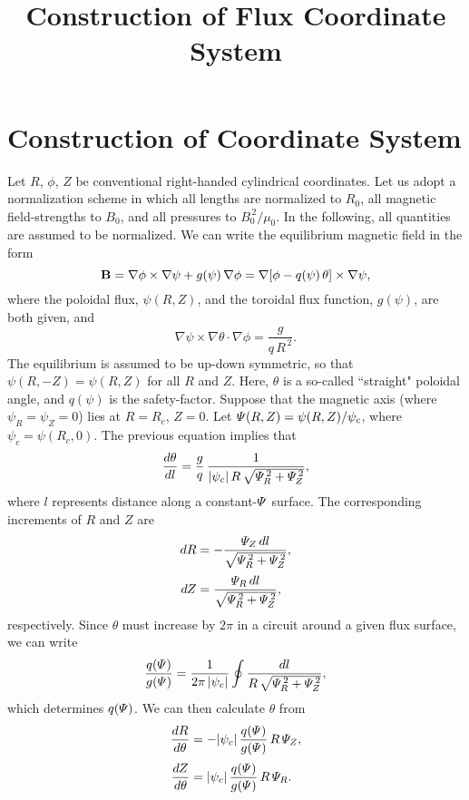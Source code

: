 \documentclass[12pt,prb,aps,notitlepage]{revtex4-1}
\begin{document}
\title{Construction of Flux Coordinate System}
\maketitle

\section{Construction of Coordinate System}
Let $R$, $\phi$, $Z$ be conventional right-handed cylindrical coordinates. Let us adopt
a normalization scheme in which all lengths are normalized to $R_0$, all magnetic field-strengths to $B_0$, and all pressures to $B_0^{\,2}/\mu_0$. In the following, all quantities are assumed to be normalized. 
We can write the equilibrium magnetic field in the form
\begin{equation}
{\bf B} = \nabla\phi\times \nabla\psi + g(\psi)\,\nabla\phi = \nabla[\phi-q(\psi)\,\theta]\times\nabla\psi,
\end{equation}
where the poloidal flux, $\psi(R,Z)$,  and the toroidal flux function, $g(\psi)$, are both given, and 
\begin{equation}
\nabla\psi\times\nabla\theta\cdot\nabla \phi = \frac{g}{q\,R^{\,2}}.
\end{equation}
The equilibrium is assumed to be up-down symmetric, so that $\psi(R,-Z)=\psi(R,Z)$ for all $R$ and $Z$. 
Here, $\theta$ is a so-called  ``straight" poloidal angle, and $q(\psi)$ is the safety-factor. 
Suppose that the magnetic axis (where $\psi_R=\psi_Z=0$) lies at $R=R_c$, $Z=0$. 
Let ${\mit\Psi}(R,Z)=\psi(R,Z)/\psi_c$, where $\psi_c=\psi(R_c,0)$. 
The previous equation implies that
\begin{equation}
\frac{d\theta}{dl} = \frac{g}{q}\,\frac{1}{|\psi_c|\,R\,\sqrt{{\mit\Psi}_R^{\,2}+{\mit\Psi}_Z^{\,2}}},
\end{equation}
where $l$ represents distance along a constant-${\mit\Psi}$ surface. The corresponding increments of $R$ and $Z$
are
\begin{align}
dR &= -\frac{{\mit\Psi}_Z\,dl}{\sqrt{{\mit\Psi}_R^{\,2} + {\mit\Psi}_Z^{\,2}}},\\[0.5ex]
dZ &= \frac{{\mit\Psi}_R\,dl}{\sqrt{{\mit\Psi}_R^{\,2} + {\mit\Psi}_Z^{\,2}}},
\end{align}
respectively.
Since $\theta$ must increase by $2\pi$ in a circuit around a given flux surface, we can write
\begin{equation}
\frac{q({\mit\Psi})}{g({\mit\Psi})} = \frac{1}{2\pi\,|\psi_c|}\oint \frac{dl}{R\,\sqrt{{\mit\Psi}_R^{\,2}+{\mit\Psi}_Z^{\,2}}},
\end{equation}
which determines $q({\mit\Psi})$. We can then calculate $\theta$ from 
\begin{align}
\frac{dR}{d\theta} &= -|\psi_c|\,\frac{q({\mit\Psi})}{g({\mit\Psi})}\,R\,{\mit\Psi}_Z,\\[0.5ex]
\frac{dZ}{d\theta} &= |\psi_c|\,\frac{q({\mit\Psi})}{g({\mit\Psi})}\,R\,{\mit\Psi}_R.
\end{align}
\end{document}
